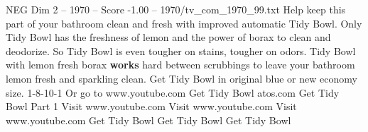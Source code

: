 \begin{textsample}{NEG Dim 2 – 1970 – Score -1.00 – 1970/tv\_com\_1970\_99.txt}  \label{ex:f2_neg_047}
Help keep this part of your bathroom clean and fresh with improved automatic Tidy Bowl.
Only Tidy Bowl has the freshness of lemon and the power of borax to clean and deodorize.
So Tidy Bowl is even tougher on stains, tougher on odors.
Tidy Bowl with lemon fresh borax \textbf{works} hard between scrubbings to leave your bathroom lemon fresh and sparkling clean.
Get Tidy Bowl in original blue or new economy size. 1-8-10-1 Or go to www.youtube.com Get Tidy Bowl atos.com Get Tidy Bowl Part 1 Visit www.youtube.com Visit www.youtube.com Visit www.youtube.com Get Tidy Bowl Get Tidy Bowl Get Tidy Bowl

\end{textsample}
